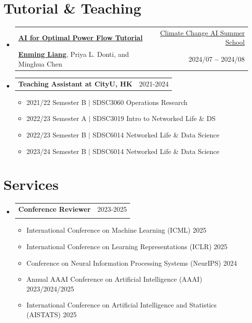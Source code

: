 \documentclass[letterpaper,11pt]{article}
\makeatletter
\newcommand{\resumeItem}[1]{
  \item\small{
    {#1 \vspace{-2pt}}
  }
}
\newcommand{\resumeSubheading}[4]{
  \vspace{-2pt}\item
    \begin{tabular*}{0.97\textwidth}[t]{l@{\extracolsep{\fill}}r}
      \textbf{#1} & #2 \\
      {\small#3} & {\small #4} \\
    \end{tabular*}\vspace{-7pt}
}
\newcommand{\resumeSubSubheading}[2]{
    \vspace{-2pt}\item
    \begin{tabular*}{0.97\textwidth}{l@{\extracolsep{\fill}}r}
      \textbf{#1} & #2 \\
    \end{tabular*}
    \vspace{-5pt}
}
\newcommand{\resumeSubHeadingListStart}{\begin{itemize}[leftmargin=0.15in, label={}]}
\newcommand{\resumeSubHeadingListEnd}{\end{itemize}}
\newcommand{\resumeItemListStart}{\begin{itemize}}
\newcommand{\resumeItemListEnd}{\end{itemize}\vspace{-5pt}}
\makeatother
\begin{document}
\section{\LARGE Tutorial \& Teaching}
\vspace{5pt}
\resumeSubHeadingListStart
\resumeSubheading
{\href{https://githubtocolab.com/climatechange-ai-tutorials/optimal-power-flow/blob/main/AI_for_Optimal_Power_Flow.ipynb}{AI for Optimal Power Flow Tutorial}}
{\href{https://www.climatechange.ai/tutorials?}{Climate Change AI Summer School}}
{\underline{\textbf{Enming Liang}}, 
Priya L. Donti, and 
Minghua Chen}{2024/07 \textbf{--} 2024/08}

\vspace{10pt}
\resumeSubSubheading
{Teaching Assistant at CityU, HK}{2021-2024}
\resumeItemListStart
\resumeItem{2021/22 Semester B}{$|$  }{ SDSC3060 Operations Research}
\vspace{1pt}
\resumeItem{2022/23 Semester A}{$|$  }{ SDSC3019 Intro to Networked Life \& DS}
\vspace{1pt}
\resumeItem{2022/23 Semester B}{$|$  }{ SDSC6014 Networked Life \& Data Science}
\vspace{1pt}
\resumeItem{2023/24 Semester B}{$|$  }{ SDSC6014 Networked Life \& Data Science}
\resumeItemListEnd

\vspace{5pt}
\resumeSubHeadingListEnd






\section{\LARGE Services}
\vspace{3pt}
\resumeSubHeadingListStart

\resumeSubheading
{{Conference Reviewer}}{2023-2025}
{}{}
\vspace{-15pt}
\resumeItemListStart
\resumeItem{International Conference on Machine Learning (ICML)}{2025}
\resumeItem{International Conference on Learning Representations (ICLR)}{2025}
\resumeItem{Conference on Neural Information Processing Systems (NeurIPS)}{2024}
\resumeItem{Annual AAAI Conference on Artificial Intelligence (AAAI)}{2023/2024/2025}
\resumeItem{International Conference on Artificial Intelligence and Statistics (AISTATS)}{2025}
\resumeItemListEnd
\resumeSubHeadingListEnd
\end{document}
